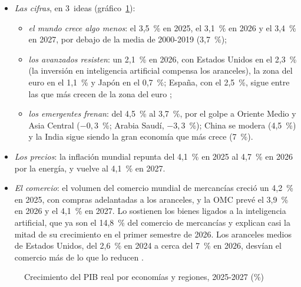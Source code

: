 \documentclass[11pt]{article}
\begin{document}
\begin{itemize}
\item \emph{Las cifras}, en 3~ideas (gráfico~\ref{fig:crecimiento-regiones}):
  \begin{itemize}
  \item \emph{el mundo crece algo menos}: el 3,5~\% en 2025, el 3,1~\% en 2026 y el 3,4~\% en 2027, por debajo de la media de 2000-2019 (3,7~\%)\nocite{FMI2026DataMapper};
  \item \emph{los avanzados resisten}: un 2,1~\% en 2026, con Estados Unidos en el 2,3~\% (la inversión en inteligencia artificial compensa los aranceles), la zona del euro en el 1,1~\% y Japón en el 0,7~\%\nocite{FMI2026DataMapper}; España, con el 2,5~\%, sigue entre las que más crecen de la zona del euro ;
  \item \emph{los emergentes frenan}: del 4,5~\% al 3,7~\%, por el golpe a Oriente Medio y Asia Central ($-0{,}3$~\%; Arabia Saudí, $-3{,}3$~\%); China se modera (4,5~\%) y la India sigue siendo la gran economía que más crece (7~\%).
  \end{itemize}
\item \emph{Los precios}: la inflación mundial repunta del 4,1~\% en 2025 al 4,7~\% en 2026 por la energía, y vuelve al 4,1~\% en 2027\nocite{FMI2026DataMapper}.
\item \emph{El comercio}: el volumen del comercio mundial de mercancías creció un 4,2~\% en 2025, con compras adelantadas a los aranceles, y la OMC prevé el 3,9~\% en 2026 y el 4,1~\% en 2027. Lo sostienen los bienes ligados a la inteligencia artificial, que ya son el 14,8~\% del comercio de mercancías y explican casi la mitad de su crecimiento en el primer semestre de 2026\nocite{OMC2026PerspectivasOct}. Los aranceles medios de Estados Unidos, del 2,6~\% en 2024 a cerca del 7~\% en 2026, desvían el comercio más de lo que lo reducen\nocite{BEA2026Aranceles} .
\end{itemize}

\begin{figure}[H]
\centering
\caption{Crecimiento del PIB real por economías y regiones, 2025-2027 (\%)}\label{fig:crecimiento-regiones}
\end{figure}
\end{document}

